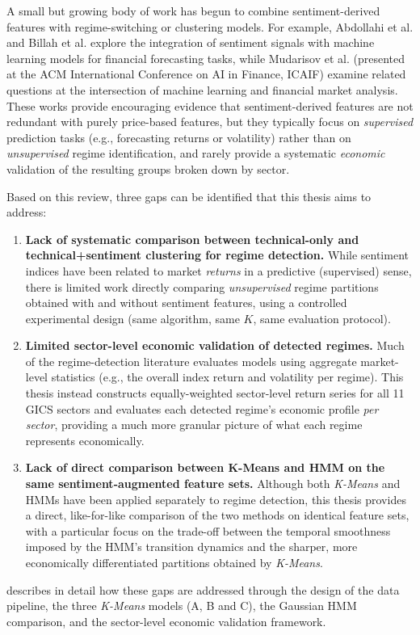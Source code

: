 A small but growing body of work has begun to combine sentiment-derived
features with regime-switching or clustering models. For example,
Abdollahi et al. \cite{abdollahi2024} and Billah et al.
\cite{billah2024} explore the integration of sentiment signals with
machine learning models for financial forecasting tasks, while Mudarisov
et al. \cite{mudarisov2024} (presented at the ACM International Conference
on AI in Finance, ICAIF) examine related questions at the intersection of
machine learning and financial market analysis. These works provide
encouraging evidence that sentiment-derived features are not redundant
with purely price-based features, but they typically focus on
\emph{supervised} prediction tasks (e.g., forecasting returns or
volatility) rather than on \emph{unsupervised} regime identification, and
rarely provide a systematic \emph{economic} validation of the resulting
groups broken down by sector.

Based on this review, three gaps can be identified that this thesis aims
to address:

\begin{enumerate}
  \item \textbf{Lack of systematic comparison between technical-only and
  technical+sentiment clustering for regime detection.} While sentiment
  indices have been related to market \emph{returns} in a predictive
  (supervised) sense, there is limited work directly comparing
  \textit{unsupervised} regime partitions obtained with and without
  sentiment features, using a controlled experimental design (same
  algorithm, same $K$, same evaluation protocol).
  \item \textbf{Limited sector-level economic validation of detected
  regimes.} Much of the regime-detection literature evaluates models using
  aggregate market-level statistics (e.g., the overall index return and
  volatility per regime). This thesis instead constructs
  equally-weighted sector-level return series for all 11 GICS sectors and
  evaluates each detected regime's economic profile \emph{per sector},
  providing a much more granular picture of what each regime represents
  economically.
  \item \textbf{Lack of direct comparison between K-Means and HMM on the
  same sentiment-augmented feature sets.} Although both \textit{K-Means}
  and HMMs have been applied separately to regime detection, this thesis
  provides a direct, like-for-like comparison of the two methods on
  identical feature sets, with a particular focus on the trade-off between
  the temporal smoothness imposed by the HMM's transition dynamics and the
  sharper, more economically differentiated partitions obtained by
  \textit{K-Means}.
\end{enumerate}

 describes in detail how these gaps are addressed
through the design of the data pipeline, the three \textit{K-Means}
models (A, B and C), the Gaussian HMM comparison, and the sector-level
economic validation framework.
